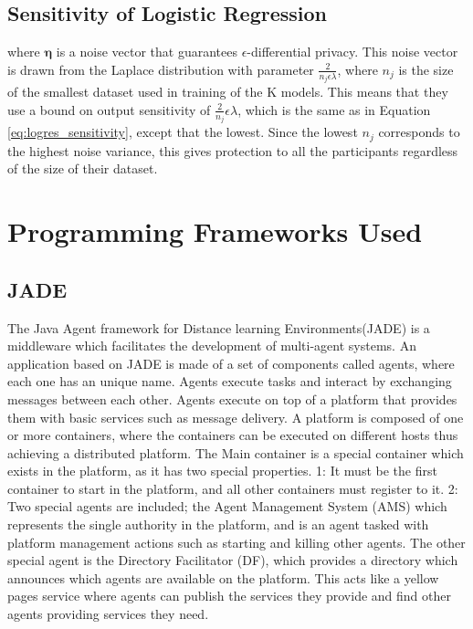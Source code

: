 \subsection{Sensitivity of Logistic Regression}

where $\boldsymbol{\eta}$ is a noise vector that guarantees $\epsilon$-differential privacy. This noise vector is drawn from the Laplace distribution with parameter $\frac{2}{n_j\epsilon\lambda}$, where $n_j$ is the size of the smallest dataset used in training of the K models. This means that they use a bound on output sensitivity of $\frac{2}{n_j}\epsilon\lambda$, which is the same as in Equation \ref{eq:logres_sensitivity}, except that the lowest. Since the lowest $n_j$ corresponds to the highest noise variance, this gives protection to all the participants regardless of the size of their dataset.
	


 \section{Programming Frameworks Used}

 \subsection{JADE}
 The Java Agent framework for Distance learning Environments(JADE) is a middleware which facilitates the development of multi-agent systems. An application based on JADE is made of a set of components called agents, where each one has an unique name. Agents execute tasks and interact by exchanging messages between each other. Agents execute on top of a platform that provides them with basic services such as message delivery. A platform is composed of one or more containers, where the containers can be executed on different hosts thus achieving a distributed platform. The Main container is a special container which exists in the platform, as it has two special properties. 1: It must be the first container to start in the platform, and all other containers must register to it. 2: Two special agents are included; the Agent Management System (AMS) which represents the single authority in the platform, and is an agent tasked with platform management actions such as starting and killing other agents. The other special agent is the Directory Facilitator (DF), which provides a directory which announces which agents are available on the platform. This acts like a yellow pages service where agents can publish the services they provide and find other agents providing services they need.

